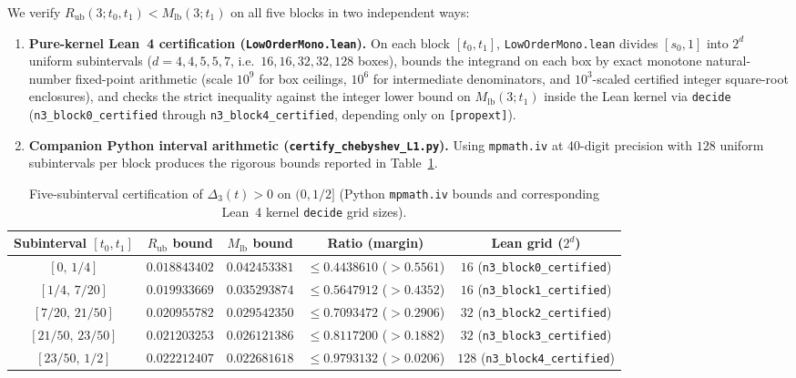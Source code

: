 \documentclass[11pt,a4paper]{article}
\renewcommand{\UrlFont}{\ttfamily\small}
\newcommand{\code}[1]{\nolinkurl{#1}}
\theoremstyle{remark}
\numberwithin{equation}{section}
\begin{document}
We verify $R_{\mathrm{ub}}(3; t_0, t_1) < M_{\mathrm{lb}}(3; t_1)$ on all five blocks in two independent ways:
\begin{enumerate}[label=\textup{(\arabic*)}]
    \item \textbf{Pure-kernel Lean~4 certification (\code{LowOrderMono.lean}).} On each block $[t_0, t_1]$, \code{LowOrderMono.lean} divides $[s_0, 1]$ into $2^d$ uniform subintervals ($d = 4, 4, 5, 5, 7$, i.e.\ $16, 16, 32, 32, 128$ boxes), bounds the integrand on each box by exact monotone natural-number fixed-point arithmetic (scale $10^9$ for box ceilings, $10^6$ for intermediate denominators, and $10^3$-scaled certified integer square-root enclosures), and checks the strict inequality against the integer lower bound on $M_{\mathrm{lb}}(3; t_1)$ inside the Lean kernel via \code{decide} (\code{n3_block0_certified} through \code{n3_block4_certified}, depending only on \code{[propext]}).
    \item \textbf{Companion Python interval arithmetic (\code{certify_chebyshev_L1.py}).} Using \code{mpmath.iv} at 40-digit precision with $128$ uniform subintervals per block produces the rigorous bounds reported in Table~\ref{tab:n3-cert}.
\end{enumerate}

\begin{table}[htbp]
\centering
\caption{Five-subinterval certification of $\Delta_3(t) > 0$ on $(0, 1/2]$ (Python \code{mpmath.iv} bounds and corresponding Lean~4 kernel \code{decide} grid sizes).}
\label{tab:n3-cert}
\footnotesize
\renewcommand{\UrlFont}{\ttfamily\footnotesize}
\setlength{\tabcolsep}{4.5pt}
\begin{tabular}{@{}ccccc@{}}
\toprule
Subinterval $[t_0, t_1]$ & $R_{\mathrm{ub}}$ bound & $M_{\mathrm{lb}}$ bound & Ratio (margin) & Lean grid ($2^d$) \\
\midrule
$[0,\, 1/4]$      & $0.018843402$ & $0.042453381$ & $\le 0.4438610$ ($>0.5561$) & $16$ (\code{n3_block0_certified}) \\
$[1/4,\, 7/20]$   & $0.019933669$ & $0.035293874$ & $\le 0.5647912$ ($>0.4352$) & $16$ (\code{n3_block1_certified}) \\
$[7/20,\, 21/50]$ & $0.020955782$ & $0.029542350$ & $\le 0.7093472$ ($>0.2906$) & $32$ (\code{n3_block2_certified}) \\
$[21/50,\, 23/50]$& $0.021203253$ & $0.026121386$ & $\le 0.8117200$ ($>0.1882$) & $32$ (\code{n3_block3_certified}) \\
$[23/50,\, 1/2]$  & $0.022212407$ & $0.022681618$ & $\le 0.9793132$ ($>0.0206$) & $128$ (\code{n3_block4_certified}) \\
\bottomrule
\end{tabular}
\end{table}
\end{document}
